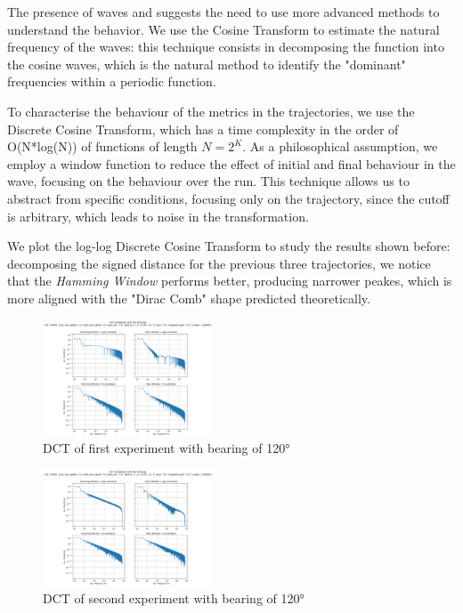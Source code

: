 \documentclass[11pt, twocolumn]{article}
\begin{document}
        The presence of waves and suggests the need to use more advanced methods to understand the behavior. We use the Cosine Transform to estimate the natural frequency of the waves: this technique consists in decomposing the function into the cosine waves, which is the natural method to identify the "dominant" frequencies within a periodic function.

        To characterise the behaviour of the metrics in the trajectories, we use the Discrete Cosine Transform, which has a time complexity in the order of O(N*log(N)) of functions of length $N = 2^K$. As a philosophical assumption, we employ a window function to reduce the effect of initial and final behaviour in the wave, focusing on the behaviour over the run. This technique allows us to abstract from specific conditions, focusing only on the trajectory, since the cutoff is arbitrary, which leads to noise in the transformation.

        We plot the log-log Discrete Cosine Transform to study the results shown before: decomposing the signed distance for the previous three trajectories, we notice that the \textit{Hamming Window} performs better, producing narrower peakes, which is more aligned with the "Dirac Comb" shape predicted theoretically.
        \begin{figure}[H]
          \centering
          \includegraphics[width=0.45\textwidth]{figures/dct_120_loglog.png}
          \caption{DCT of first experiment with bearing of 120°}
          \label{fig:dct1}
        \end{figure}

        \begin{figure}[H]
          \centering
          \includegraphics[width=0.45\textwidth]{figures/dct_240_loglog.png}
          \caption{DCT of second experiment with bearing of 120°}
          \label{fig:dct2}
        \end{figure}
\end{document}
